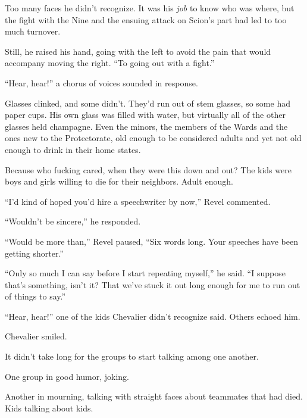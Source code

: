 Too many faces he didn't recognize.  It was his \emph{job} to know who was where, but the fight with the Nine and the ensuing attack on Scion's part had led to too much turnover.



Still, he raised his hand, going with the left to avoid the pain that would accompany moving the right.  ``To going out with a fight.''



``Hear, hear!'' a chorus of voices sounded in response.



Glasses clinked, and some didn't.  They'd run out of stem glasses, so some had paper cups.  His own glass was filled with water, but virtually all of the other glasses held champagne.  Even the minors, the members of the Wards and the ones new to the Protectorate, old enough to be considered adults and yet not old enough to drink in their home states.



Because who fucking cared, when they were this down and out?  The kids were boys and girls willing to die for their neighbors.  Adult enough.



``I'd kind of hoped you'd hire a speechwriter by now,'' Revel commented.



``Wouldn't be sincere,'' he responded.



``Would be more than,'' Revel paused, ``Six words long.  Your speeches have been getting shorter.''



``Only so much I can say before I start repeating myself,'' he said.  ``I suppose that's something, isn't it?  That we've stuck it out long enough for me to run out of things to say.''



``Hear, hear!'' one of the kids Chevalier didn't recognize said.  Others echoed him.



Chevalier smiled.



It didn't take long for the groups to start talking among one another.



One group in good humor, joking.



Another in mourning, talking with straight faces about teammates that had died.  Kids talking about kids.



